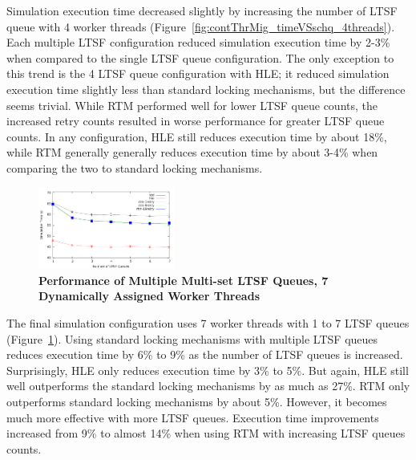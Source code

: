 \documentclass{sig-alternate}
\begin{document}
Simulation execution time decreased slightly by increasing the number of LTSF queue with 4
worker threads (Figure~\ref{fig:contThrMig_timeVSschq_4threads}).  Each multiple LTSF
configuration reduced simulation execution time by 2-3\% when compared to the single LTSF
queue configuration.  The only exception to this trend is the 4 LTSF queue configuration
with HLE; it reduced simulation execution time slightly less than standard locking
mechanisms, but the difference seems trivial.  While RTM performed well for lower LTSF
queue counts, the increased retry counts resulted in worse performance for greater LTSF
queue counts.  In any configuration, HLE still reduces execution time by about 18\%, while
RTM generally generally reduces execution time by about 3-4\% when comparing the two to
standard locking mechanisms.

\begin{figure}
    \centering
    \graphicspath{ {./figures/} }
    \includegraphics[width=0.4\textwidth,keepaspectratio]{hugeepidemicsim-CONTmig-timeVSschedQs-multiset-7thread}
    \caption{\textbf{Performance of Multiple Multi-set LTSF Queues, 7 Dynamically Assigned Worker Threads}}
    \label{fig:contThrMig_timeVSschq_7threads}
\end{figure}

The final simulation configuration uses 7 worker threads with 1 to 7 LTSF queues
(Figure~\ref{fig:contThrMig_timeVSschq_7threads}).  Using standard locking mechanisms with
multiple LTSF queues reduces execution time by 6\% to 9\% as the number of LTSF queues is
increased.  Surprisingly, HLE only reduces execution time by 3\% to 5\%.  But again, HLE
still well outperforms the standard locking mechanisms by as much as 27\%.  RTM only
outperforms standard locking mechanisms by about 5\%.  However, it becomes much more
effective with more LTSF queues.  Execution time improvements increased from 9\% to almost
14\% when using RTM with increasing LTSF queues counts.
\end{document}
